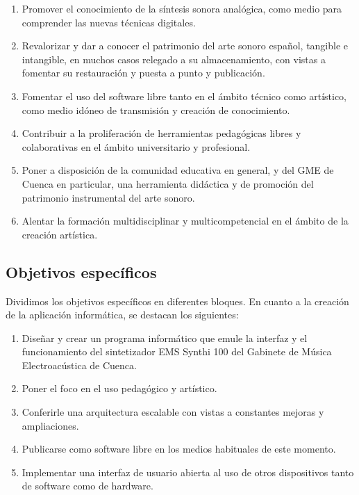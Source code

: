 \begin{enumerate}
	\item Promover el conocimiento de la síntesis sonora analógica, como medio para comprender las nuevas técnicas digitales.
	\item Revalorizar y dar a conocer el patrimonio del arte sonoro español, tangible e intangible, en muchos casos relegado a su almacenamiento, con vistas a fomentar su restauración y puesta a punto y publicación.
	\item Fomentar el uso del software libre tanto en el ámbito técnico como artístico, como medio idóneo de transmisión y creación de conocimiento.
	\item Contribuir a la proliferación de herramientas pedagógicas libres y colaborativas en el ámbito universitario y profesional.
	\item Poner a disposición de la comunidad educativa en general, y del GME de Cuenca en particular, una herramienta didáctica y de promoción del patrimonio instrumental del arte sonoro.
	\item Alentar la formación multidisciplinar y multicompetencial en el ámbito de la creación artística.
\end{enumerate}





\subsection{Objetivos específicos}

Dividimos los objetivos específicos en diferentes bloques. En cuanto a la creación de la aplicación informática, se destacan los siguientes:

\begin{enumerate}
	
	\item Diseñar y crear un programa informático que emule la interfaz y el funcionamiento del sintetizador EMS Synthi 100 del Gabinete de Música Electroacústica de Cuenca.
	\item Poner el foco en el uso pedagógico y artístico.
	\item Conferirle una arquitectura escalable con vistas a constantes mejoras y ampliaciones.
	\item Publicarse como software libre en los medios habituales de este momento.
	\item Implementar una interfaz de usuario abierta al uso de otros dispositivos tanto de software como de hardware.
	
\end{enumerate}

